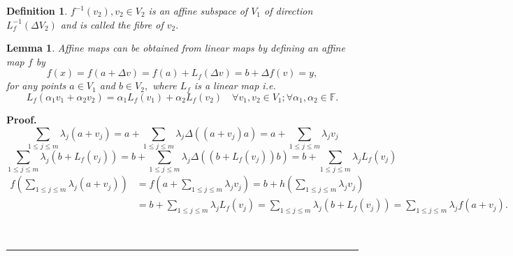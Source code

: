 \documentclass[aps,preprint]{revtex4}%
\newtheorem{definition}[theorem]{Definition}
\newtheorem{lemma}[theorem]{Lemma}
\newenvironment{proof}[1][Proof]{\noindent\textbf{#1.} }{\ \rule{0.5em}{0.5em}}
\begin{document}
\begin{definition}
$f^{-1}\left(  v_{2}\right)  ,v_{2}\in V_{2}$ is an affine subspace of $V_{1}$
of direction $L_{f}^{-1}\left(  \Delta V_{2}\right)  $ and is called the fibre
of $v_{2}.$
\end{definition}

\begin{lemma}
Affine maps can be obtained from linear maps by defining an affine map $f$ by
\begin{equation}
f\left(  x\right)  =f\left(  a+\Delta v\right)  =f\left(  a\right)
+L_{f}\left(  \Delta v\right)  =b+\Delta f\left(  v\right)  =y,
\end{equation}
for any points $a\in V_{1}$ and $b\in V_{2},$ where $L_{f}$ is a linear map
i.e.
\begin{equation}
L_{f}\left(  \alpha_{1}v_{1}+\alpha_{2}v_{2}\right)  =\alpha_{1}L_{f}\left(
v_{1}\right)  +\alpha_{2}L_{f}\left(  v_{2}\right)  \quad\forall v_{1}%
,v_{2}\in V_{1};\forall\alpha_{1},\alpha_{2}\in\mathbb{F}.
\end{equation}

\end{lemma}

\begin{proof}%
\begin{equation}
\sum_{1\leq j\leq m}\lambda_{j}\left(  a+v_{j}\right)  =a+\sum_{1\leq j\leq
m}\lambda_{j}\Delta\left(  \left(  a+v_{j}\right)  a\right)  =a+\sum_{1\leq
j\leq m}\lambda_{j}v_{j}%
\end{equation}%
\begin{equation}
\sum_{1\leq j\leq m}\lambda_{j}\left(  b+L_{f}\left(  v_{j}\right)  \right)
=b+\sum_{1\leq j\leq m}\lambda_{j}\Delta\left(  \left(  b+L_{f}\left(
v_{j}\right)  \right)  b\right)  =b+\sum_{1\leq j\leq m}\lambda_{j}%
L_{f}\left(  v_{j}\right)
\end{equation}%
\begin{align}
f\left(  \sum_{1\leq j\leq m}\lambda_{j}\left(  a+v_{j}\right)  \right)   &
=f\left(  a+\sum_{1\leq j\leq m}\lambda_{j}v_{j}\right)  =b+h\left(
\sum_{1\leq j\leq m}\lambda_{j}v_{j}\right) \\
&  =b+\sum_{1\leq j\leq m}\lambda_{j}L_{f}\left(  v_{j}\right)  =\sum_{1\leq
j\leq m}\lambda_{j}\left(  b+L_{f}\left(  v_{j}\right)  \right)  =\sum_{1\leq
j\leq m}\lambda_{j}f\left(  a+v_{j}\right)  .
\end{align}

\end{proof}
\end{document}
